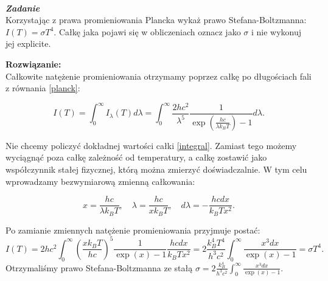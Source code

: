 \documentclass[11pt,a4paper]{article}
\newcounter{zadanie}\newcommand{\zadanie}[1][]{\addtocounter{zadanie}{1} ~\\  {\bf \emph{Zadanie \arabic{zadanie} #1 }} \\}
\begin{document}

\newpage

\zadanie
Korzystając z prawa promieniowania Plancka wykaż prawo Stefana-Boltzmanna:  $I(T) = \sigma T^4$.
Całkę jaka pojawi się w obliczeniach oznacz jako $\sigma$ i nie wykonuj jej explicite.


\vskip 10pt
\textbf{Rozwiązanie:}\\
Całkowite natężenie promieniowania otrzymamy poprzez całkę po długościach fali z równania \eqref{planck}:

\begin{equation}
  I(T) = \int_0^\infty I_\lambda(T) d\lambda =
  \int_0^\infty \frac{2 h c^2}{\lambda^5} \frac{1}{\exp\left(\frac{h c}{\lambda k_B T}\right)-1} d\lambda. \label{integral}
\end{equation}

Nie chcemy policzyć dokładnej wartości całki \eqref{integral}. Zamiast tego możemy wyciągnąć poza
całkę zależność od temperatury, a całkę zostawić jako współczynnik stałej fizycznej, którą można
zmierzyć doświadczalnie. W tym celu wprowadzamy bezwymiarową zmienną całkowania:

\begin{equation}
x = \frac{h c}{\lambda k_B T}, \quad \lambda = \frac{h c}{x k_B T},\quad d\lambda = - \frac{h c dx}{k_B T x^2}.
\end{equation}

Po zamianie zmiennych natężenie promieniowania przyjmuje postać:
\begin{equation}
  I(T) = 2 h c^2 \int_0^\infty \left(\frac{xk_B T}{hc}\right)^5 \frac{1}{\exp(x)-1}
  \frac{h c dx}{k_B T x^2} =
  2 \frac{k_B^4 T^4}{h^3 c^2} \int_0^\infty \frac{x^3 dx}{\exp(x)-1} = \sigma T^4.
\end{equation}
Otrzymaliśmy prawo Stefana-Boltzmanna ze stałą $\sigma = 2 \frac{k_B^4}{h^3 c^2} \int_0^\infty \frac{x^3 dx}{\exp(x)-1}$.
\end{document}
